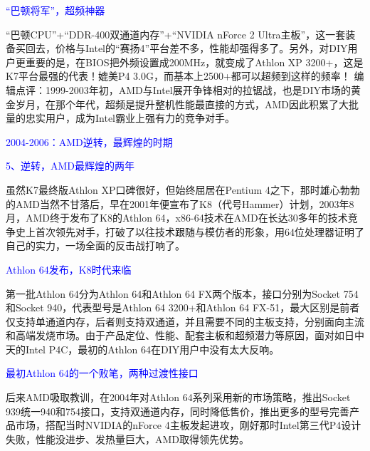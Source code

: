 \documentclass[utf8]{book}
\begin{document}
	\begin{flushleft}
		{\large \textcolor{blue}{“巴顿将军”，超频神器\\}}
	\end{flushleft}

	“巴顿CPU”+“DDR-400双通道内存”+“NVIDIA nForce 2 Ultra主板”，这一套装备买回去，价格与Intel的“赛扬4”平台差不多，性能却强得多了。另外，对DIY用户更重要的是，在BIOS把外频设置成200MHz，就变成了Athlon XP 3200+，这是K7平台最强的代表！媲美P4 3.0G，而基本上2500+都可以超频到这样的频率！
	编辑点评：1999-2003年初，AMD与Intel展开争锋相对的拉锯战，也是DIY市场的黄金岁月，在那个年代，超频是提升整机性能最直接的方式，AMD因此积累了大批量的忠实用户，成为Intel霸业上强有力的竞争对手。

	\begin{flushleft}
		{\Large \textcolor{blue}{2004-2006：AMD逆转，最辉煌的时期}}
	\end{flushleft}

	\begin{flushleft}
		{\large \textcolor{blue}{5、逆转，AMD最辉煌的两年\\}}
	\end{flushleft}

	虽然K7最终版Athlon XP口碑很好，但始终屈居在Pentium 4之下，那时雄心勃勃的AMD当然不甘落后，早在2001年便宣布了K8（代号Hammer）计划，2003年8月，AMD终于发布了K8的Athlon 64，x86-64技术在AMD在长达30多年的技术竞争史上首次领先对手，打破了以往技术跟随与模仿者的形象，用64位处理器证明了自己的实力，一场全面的反击战打响了。


	\begin{flushleft}
		{\large \textcolor{blue}{Athlon 64发布，K8时代来临\\}}
	\end{flushleft}

	第一批Athlon 64分为Athlon 64和Athlon 64 FX两个版本，接口分别为Socket 754和Socket 940，代表型号是Athlon 64 3200+和Athlon 64 FX-51，最大区别是前者仅支持单通道内存，后者则支持双通道，并且需要不同的主板支持，分别面向主流和高端发烧市场。由于产品定位、性能、配套主板和超频潜力等原因，面对如日中天的Intel P4C，最初的Athlon 64在DIY用户中没有太大反响。


	\begin{flushleft}
		{\large \textcolor{blue}{最初Athlon 64的一个败笔，两种过渡性接口\\}}
	\end{flushleft}

	后来AMD吸取教训，在2004年对Athlon 64系列采用新的市场策略，推出Socket 939统一940和754接口，支持双通道内存，同时降低售价，推出更多的型号完善产品市场，搭配当时NVIDIA的nForce 4主板发起进攻，刚好那时Intel第三代P4设计失败，性能没进步、发热量巨大，AMD取得领先优势。
\end{document}
